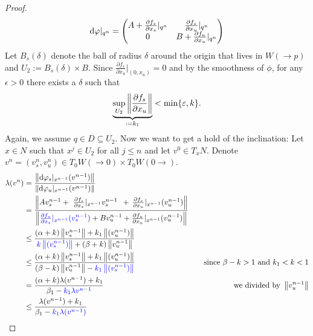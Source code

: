 \begin{proof}
	\begin{align*}
		\mathop{}\!\mathrm{d} \varphi|_{q^n}=\begin{pmatrix}
			A+ \frac{\partial f_s}{\partial x_s}|_{q^n}&    \frac{\partial f_s}{\partial x_u}|_{q^n}\\
			0                                   & B+ \frac{\partial f_u}{\partial x_u}|_{q^n}
		\end{pmatrix} 
	\end{align*}
	Let $B_s(\delta)$ denote the ball of radius $\delta$ around the origin that lives in $W(\to p)$ and $U_2:= B_s(\delta)\times B$. Since $\frac{\partial f_s}{\partial x_u}|_{(0,x_u)}=0$ and by the smoothness of  $\phi$, for any $\epsilon >0$ there exists a $\delta$ such that 
	\begin{align*}
		\underbrace{\sup_{U_2}\left\lVert\frac{\partial f_s}{\partial x_u}\right\rVert}_{:=k_1}< \min\{\varepsilon, k \}.
	\end{align*} 
	Again, we assume $q\in D\subseteq  U_2$. Now we want to get a hold of the inclination:  Let $x\in N$ such that $x^j\in U_2 $ for all $j\leq n$ and let $v^0\in T_xN$. Denote $v^n=(v^n_s,v^n_u)\in T_0W(\to 0)\times T_0W(0 \to)$. 
	\begin{align}
		\lambda(v^n)&= \frac{\left\lVert\mathop{}\!\mathrm{d} \varphi_s|_{x^{n-1}}(v^{n-1})\right\rVert}{\left\lVert\mathop{}\!\mathrm{d} \varphi_u|_{x^{n-1}}(v^{n-1})\right\rVert} \nonumber \\
		&=\frac{\left\lVert Av_s^{n-1} +\ \frac{\partial f_s}{\partial x_s}|_{x^{n-1}}v_s^{n-1} \ \, + \, \frac{\partial f_s}{\partial x_u}|_{x^{n-1}}(v_u^{n-1})\right\rVert}{\left\lVert\color{blue} \frac{\partial f_u}{\partial x_s}|_{x^{n-1}}(v_s^{n-1}) \color{black}+   Bv_u^{n-1}+\frac{\partial f_u}{\partial x_u}|_{x^{n-1}}(v_u^{n-1})\right\rVert} \nonumber \\
		& \leq \frac{ (\alpha +k )\left\lVert v_s^{n-1}\right\rVert+k_1 \left\lVert(v_u^{n-1})\right\rVert}
		{ \color{blue}k \left\lVert(v_s^{n-1})\right\rVert \color{black}  +  (\beta+k)\left\lVert v_u^{n-1}\right\rVert} \nonumber \\
		& \leq \frac{ (\alpha +k )\left\lVert v_s^{n-1}\right\rVert+k_1 \left\lVert(v_u^{n-1})\right\rVert}
		{ (\beta-k)\left\lVert v_u^{n-1}\right\rVert  - \color{blue} k_1 \left\lVert(v_s^{n-1})\right\rVert \color{black} } &\quad \text{since } \beta-k>1 \text{ and }k_1<k<1 \nonumber \\
		& = \frac{ (\alpha +k )\lambda(v^{n-1})+k_1}
		{ \beta_1  - \color{blue} k_1 \lambda{v^{n-1}\color{black} }} &\quad \text{we divided by }\left\lVert v_u^{n-1}\right\rVert \nonumber \\
		&\leq \frac{\lambda(v^{n-1})+k_1}
		{ \beta_1  - \color{blue} k_1 \lambda(v^{n-1}) \color{black} }  \label{eq: estimate lambda(v^n)}				
	\end{align} 

\end{proof}
